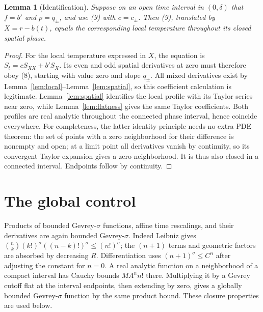 \documentclass[11pt]{article}
\newtheorem{lemma}[theorem]{Lemma}
\begin{document}
\begin{lemma}[Identification]\label{lem:identify}
Suppose on an open time interval in $(0,\delta)$ that $f=b'$ and
$p=q_\pm$, and use (9) with $c=c_\pm$. Then (9), translated by
$X=r-b(t)$, equals the corresponding local temperature throughout
its closed spatial phase.
\end{lemma}
\begin{proof}
For the local temperature expressed in $X$, the equation is
$S_t=cS_{XX}+b'S_X$. Its even and odd spatial derivatives at zero
must therefore obey (8), starting with value zero and slope $q_\pm$.
All mixed derivatives exist by Lemma~\ref{lem:local}--Lemma~\ref{lem:spatial}, so this coefficient calculation
is legitimate. Lemma~\ref{lem:spatial} identifies the local profile with its Taylor series
near zero, while Lemma~\ref{lem:flatness} gives the same Taylor coefficients. Both profiles
are real analytic throughout the connected phase interval, hence
coincide everywhere. For completeness, the latter identity principle
needs no extra PDE theorem: the set of points with a zero neighborhood
for their difference is nonempty and open; at a limit point all
derivatives vanish by continuity, so its convergent Taylor expansion
gives a zero neighborhood. It is thus also closed in a connected
interval. Endpoints follow by continuity.
\end{proof}

\section{The global control}
Products of bounded Gevrey-$\sigma$ functions, affine time rescalings,
and their derivatives are again bounded Gevrey-$\sigma$.
Indeed Leibniz gives
$\binom nk(k!)^\sigma((n-k)!)^\sigma\le(n!)^\sigma$;
the $(n+1)$ terms and geometric factors are absorbed by decreasing
$R$. Differentiation uses $(n+1)^\sigma\le C^n$ after adjusting the
constant for $n=0$. A real analytic function on a neighborhood of a
compact interval has Cauchy bounds $MA^n n!$ there. Multiplying it
by a Gevrey cutoff flat at the interval endpoints, then extending by
zero, gives a globally bounded Gevrey-$\sigma$ function by the same
product bound. These closure properties are used below.
\end{document}
